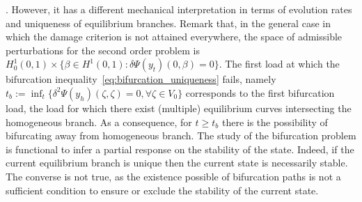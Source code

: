 . However, it has a different mechanical interpretation in terms of evolution rates and uniqueness of equilibrium branches.
Remark that, in the general case in which the damage criterion is not attained everywhere, the space of admissible perturbations for the second order problem is $H^1_0(0, 1) \times \{ \beta \in H^1(0, 1) : \delta\Psi(y_t)(0, \beta) = 0 \}$. 
The first load at which the bifurcation inequality~\eqref{eq:bifurcation_uniqueness} fails, namely $t_b:=\inf_t \{\delta^2 \Psi(y_h)(\zeta, \zeta) =0, \forall \zeta \in V_0 \}$ corresponds to the first  bifurcation load, the load for which there exist (multiple) equilibrium curves intersecting the homogeneous branch. As a consequence, for $t\geq t_b$ there is the possibility of bifurcating away from homogeneous branch. The study of the bifurcation problem is functional to infer a partial response on the stability of the state. Indeed, if the current equilibrium branch is unique then the current state is necessarily stable. The converse is not true, as the existence  possible of bifurcation paths is not a sufficient condition to ensure or exclude the stability of the current state.

